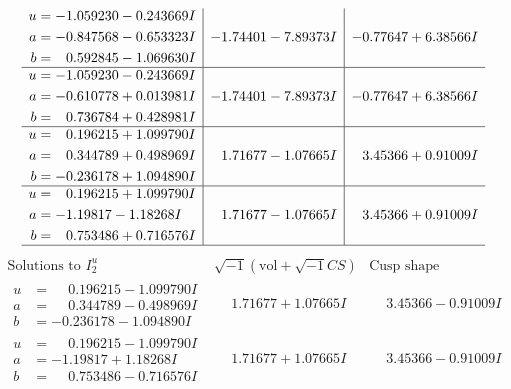 \documentclass[1p]{elsarticle_modified}
\theoremstyle{definition}
\newcommand{\I}{\sqrt{-1}}
\begin{document}
$$\begin{array}{c|c|c}
\begin{aligned}
u &= -1.059230 - 0.243669 I \\
a &= -0.847568 - 0.653323 I \\
b &= \phantom{-}0.592845 - 1.069630 I\end{aligned}
 & -1.74401 - 7.89373 I & -0.77647 + 6.38566 I \\ \hline\begin{aligned}
u &= -1.059230 - 0.243669 I \\
a &= -0.610778 + 0.013981 I \\
b &= \phantom{-}0.736784 + 0.428981 I\end{aligned}
 & -1.74401 - 7.89373 I & -0.77647 + 6.38566 I \\ \hline\begin{aligned}
u &= \phantom{-}0.196215 + 1.099790 I \\
a &= \phantom{-}0.344789 + 0.498969 I \\
b &= -0.236178 + 1.094890 I\end{aligned}
 & \phantom{-}1.71677 - 1.07665 I & \phantom{-}3.45366 + 0.91009 I \\ \hline\begin{aligned}
u &= \phantom{-}0.196215 + 1.099790 I \\
a &= -1.19817 - 1.18268 I \\
b &= \phantom{-}0.753486 + 0.716576 I\end{aligned}
 & \phantom{-}1.71677 - 1.07665 I & \phantom{-}3.45366 + 0.91009 I\\
 \hline 
 \end{array}$$\newpage$$\begin{array}{c|c|c}  
\text{Solutions to }I^u_{2}& \I (\text{vol} + \sqrt{-1}CS) & \text{Cusp shape}\\
 \hline 
\begin{aligned}
u &= \phantom{-}0.196215 - 1.099790 I \\
a &= \phantom{-}0.344789 - 0.498969 I \\
b &= -0.236178 - 1.094890 I\end{aligned}
 & \phantom{-}1.71677 + 1.07665 I & \phantom{-}3.45366 - 0.91009 I \\ \hline\begin{aligned}
u &= \phantom{-}0.196215 - 1.099790 I \\
a &= -1.19817 + 1.18268 I \\
b &= \phantom{-}0.753486 - 0.716576 I\end{aligned}
 & \phantom{-}1.71677 + 1.07665 I & \phantom{-}3.45366 - 0.91009 I \\ \hline\begin{aligned}

\end{aligned}
\end{array}$$
\end{document}
